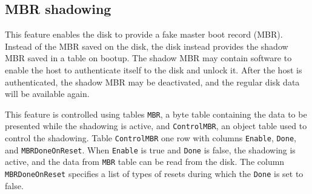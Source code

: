 
\subsection{MBR shadowing}

This feature enables the disk to provide a fake master boot record (MBR). Instead of the MBR saved on the disk, the disk instead provides the shadow MBR saved in a table on bootup. The shadow MBR may contain software to enable the host to authenticate itself to the disk and unlock it. After the host is authenticated, the shadow MBR may be deactivated, and the regular disk data will be available again.

This feature is controlled using tables \verb|MBR|, a byte table containing the data to be presented while the shadowing is active, and \verb|ControlMBR|, an object table used to control the shadowing. Table \verb|ControlMBR| one row with columns \verb|Enable|, \verb|Done|, and \verb|MBRDoneOnReset|.
When \verb|Enable| is true and \verb|Done| is false, the shadowing is active, and the data from \verb|MBR| table can be read from the disk. The column \verb|MBRDoneOnReset| specifies a list of types of resets during which the \verb|Done| is set to false.








